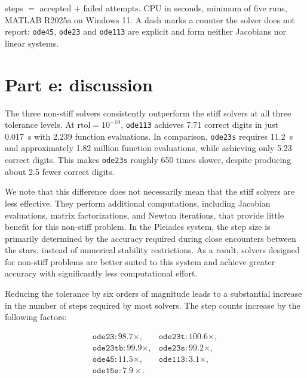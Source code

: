 \documentclass[11pt]{article}
\newcommand{\code}[1]{\texttt{#1}}
\begin{document}
\begin{center}
\footnotesize
\setlength{\tabcolsep}{3.5pt}

\end{center}

\footnotesize
steps $=$ accepted $+$ failed attempts. CPU in seconds, minimum of five runs,
MATLAB R2025a on Windows 11. A dash marks a counter the solver does not report:
\code{ode45}, \code{ode23} and \code{ode113} are explicit and form neither
Jacobians nor linear systems.
\normalsize

\section{Part e: discussion}
\label{sec:discussion}

The three non-stiff solvers consistently outperform the stiff solvers
at all three tolerance levels. At $\mathrm{rtol}=10^{-10}$,
\texttt{ode113} achieves 7.71 correct digits in just 0.017~s
with 2,239 function evaluations. In comparison, \texttt{ode23s}
requires 11.2~s and approximately 1.82 million function evaluations,
while achieving only 5.23 correct digits. This makes
\texttt{ode23s} roughly 650 times slower, despite producing about
2.5 fewer correct digits.

We note that this difference does not necessarily mean that the stiff solvers are
less effective. They perform additional computations,
including Jacobian evaluations, matrix factorizations, and Newton
iterations, that provide little benefit for this non-stiff problem.
In the Pleiades system, the step size is primarily determined by
the accuracy required during close encounters between the stars,
instead of numerical stability restrictions. As a result,
solvers designed for non-stiff problems are better suited to
this system and achieve greater accuracy with significantly
less computational effort.

Reducing the tolerance by six orders of magnitude leads to a substantial
increase in the number of steps required by most solvers. The step
counts increase by the following factors:

\[
\begin{array}{ll}
\texttt{ode23}: 98.7\times, &
\texttt{ode23t}: 100.6\times,\\
\texttt{ode23tb}: 99.9\times, &
\texttt{ode23s}: 99.2\times,\\
\texttt{ode45}: 11.5\times, &
\texttt{ode113}: 3.1\times,\\
\texttt{ode15s}: 7.9\times. &
\end{array}
\]
\end{document}
